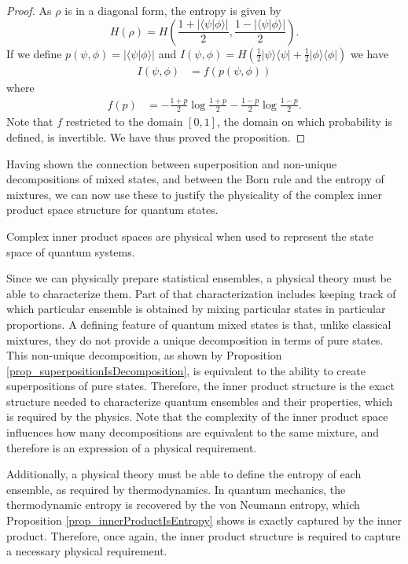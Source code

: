 \documentclass[10pt,twocolumn, nofootinbib]{revtex4-2}
\def\>{\rangle}
\def\<{\langle}
\begin{document}
\begin{proof}
As $\rho$ is in a diagonal form, the entropy is given by
\begin{equation}\label{entropy}
	H(\rho) = H\left(\frac{1+|\langle\psi|\phi\rangle|}{2}, \frac{1-|\langle\psi|\phi\rangle|}{2}\right).
\end{equation}
If we define $p(\psi, \phi) = |\langle\psi|\phi\rangle|$ and $I(\psi, \phi) = H( \frac{1}{2}|\psi\>\<\psi| + \frac{1}{2}|\phi\>\<\phi|)$ we have
\begin{align}\label{entropy}
	I(\psi, \phi) &= f(p(\psi, \phi))
\end{align}
where
\begin{align}\label{entropy}
	f(p) & = - \frac{1+p}{2} \log \frac{1+p}{2} 
	- \frac{1-p}{2} \log \frac{1-p}{2}.
\end{align}
Note that $f$ restricted to the domain $[0,1]$, the domain on which probability is defined, is invertible. We have thus proved the proposition.
\end{proof}

Having shown the connection between superposition and non-unique decompositions of mixed states, and between the Born rule and the entropy of mixtures, we can now use these to justify the physicality of the complex inner product space structure for quantum states.
\begin{prop}
Complex inner product spaces are physical when used to represent the state space of quantum systems.
\end{prop}
\begin{justification}
Since we can physically prepare statistical ensembles, a physical theory must be able to characterize them. Part of that characterization includes keeping track of which particular ensemble is obtained by mixing particular states in particular proportions. A defining feature of quantum mixed states is that, unlike classical mixtures, they do not provide a unique decomposition in terms of pure states. This non-unique decomposition, as shown by Proposition \ref{prop_superpositionIsDecomposition}, is equivalent to the ability to create superpositions of pure states. Therefore, the inner product structure is the exact structure needed to characterize quantum ensembles and their properties, which is required by the physics. Note that the complexity of the inner product space influences how many decompositions are equivalent to the same mixture, and therefore is an expression of a physical requirement.

Additionally, a physical theory must be able to define the entropy of each ensemble, as required by thermodynamics. In quantum mechanics, the thermodynamic entropy is recovered by the von Neumann entropy, which Proposition \ref{prop_innerProductIsEntropy} shows is exactly captured by the inner product. Therefore, once again, the inner product structure is required to capture a necessary physical requirement.
\end{justification}
\end{document}
